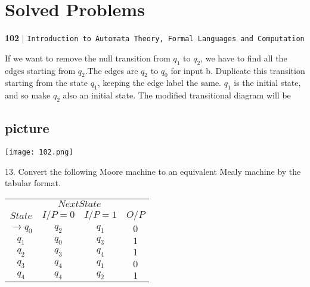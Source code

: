 \documentclass[8pt]{beamer}
\begin{document}
\begin{frame}
\section*{Solved Problems}
\begin{flushleft}
    \textbf{102}\hspace*{0.1cm} \textbf{$|$} \hspace*{0.1cm} \texttt{Introduction to Automata Theory, Formal Languages and Computation}
  \end{flushleft}
  \vspace*{1cm}
  
  If we want to remove the null transition from $q_1$ to $q_2$, we have to find all the edges starting from
$q_2$.The edges are $q_2$ to $q_0$ for input b. Duplicate this transition starting from the state $q_1$, keeping
the edge label the same. $q_1$ is the initial state, and so make $q_2$ also an initial state. The modified
transitional diagram will be\\

\vspace*{0.3cm}
\begin{center}
\section{picture}
\texttt{[image: 102.png]}
\end{center}

\vspace*{0.3cm}
\end{frame}

\begin{frame}
13. Convert the following Moore machine to an equivalent Mealy machine by the tabular format.\\

\vspace*{0.2cm}
\begin{center}
\begin{tabular}{cccc}
 \hline

 \hline

 \hline

 \hline
 & \multicolumn{2}{c}{$Next State$}\\
 \cline{2-3}
 $State$ &  $I/P=0$ & $I/P=1$  &  $O/P$\\
\hline
$\rightarrow q_0$  &    $q_2$   &  $q_1$   &  $0$ \\
$q_1$              &    $q_0$   &  $q_3$   &  $1$ \\
$q_2$              &    $q_3$   &  $q_4$   &  $1$ \\
$q_3$              &    $q_4$   &  $q_1$   &  $0$ \\
$q_4$              &    $q_4$   &  $q_2$   &  $1$ \\
 \hline

 \hline

 \hline

 \hline
\end{tabular}
\end{center}

\vspace*{0.3cm}
\end{frame}
  
\end{document}
